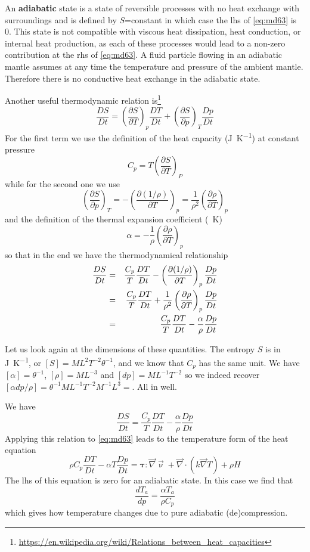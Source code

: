 An {\bf adiabatic} state is a state of reversible processes with no 
heat exchange with surroundings and is defined by $S$=constant in which 
case the lhs of \eqref{eq:md63} is 0. This state is
not compatible with viscous heat dissipation, heat conduction, or 
internal heat production, as each of these processes would lead to a 
non-zero contribution at the rhs of \eqref{eq:md63}. 
A fluid particle flowing in an adiabatic mantle assumes at any time 
the temperature and pressure
of the ambient mantle. Therefore there is no conductive heat exchange 
in the adiabatic state.

Another useful thermodynamic relation is\footnote{\url{https://en.wikipedia.org/wiki/Relations_between_heat_capacities}} 
\[
\frac{DS}{Dt} = 
\left( \frac{\partial S}{\partial T} \right)_p \frac{DT}{Dt}
+
\left( \frac{\partial S}{\partial p} \right)_T \frac{Dp}{Dt}
\]
For the first term we use the definition of the 
heat capacity (\si{\joule\per\kelvin}) at constant pressure 
\[
C_p = T \left(\frac{\partial S}{\partial T} \right)_P
\]
while for the second one we use 
\[
\left( \frac{\partial S}{\partial p}  \right)_T
= -\left( \frac{\partial (1/\rho)}{\partial T}  \right)_p
= \frac{1}{\rho^2} \left(  \frac{\partial \rho}{\partial T} \right)_p
\] 
and the definition of 
the thermal expansion coefficient (\si{\per\kelvin})
\[
\alpha = -\frac{1}{\rho} \left(\frac{\partial \rho}{\partial T} \right)_p
\] 
so that in the end  
we have the thermodynamical relationship
\begin{eqnarray}
\frac{DS}{Dt} 
&=& 
\frac{C_p}{T}\frac{DT}{Dt}-\left( \frac{\partial (1/\rho)}{\partial T}  \right)_p \frac{Dp}{Dt} \nonumber\\
&=& 
\frac{C_p}{T}\frac{DT}{Dt}+\frac{1}{\rho^2} \left( \frac{\partial \rho}{\partial T}\right)_p\frac{Dp}{Dt}\nonumber\\
&=& 
\frac{C_p}{T}\frac{DT}{Dt} - \frac{\alpha}{\rho} \frac{Dp}{Dt}\nonumber
\end{eqnarray}

\begin{remark}
Let us look again at the dimensions of these quantities.
The entropy $S$ is in \si{\joule\per\kelvin}, or $[S]=ML^2T^{-2}\theta^{-1}$, 
and we know that $C_p$ has the same unit.
We have $[\alpha]=\theta^{-1}$, $[\rho]=ML^{-3}$ and $[dp]=ML^{-1}T^{-2}$ so 
we indeed recover $[\alpha dp /\rho]= \theta^{-1} ML^{-1}T^{-2} M^{-1}L^{3}=$.
All in well.
\end{remark}

We have 
\[
\frac{DS}{Dt}
= \frac{C_p}{T} \frac{DT}{Dt} - \frac{\alpha}{\rho} \frac{Dp}{Dt} 
\]
Applying this relation to \eqref{eq:md63}
leads to the temperature form of the heat equation
\begin{equation}
\rho C_p \frac{DT}{Dt} - \alpha T \frac{Dp}{Dt} = 
{\bm \tau} : \vec\nabla\vec\upnu  
+\vec\nabla \cdot (k \vec\nabla T) + \rho H
\label{eq:md64}
\end{equation}
The lhs of this equation is zero for an adiabatic state. In this case we find that
\begin{equation}
\frac{dT_a}{dp} = \frac{\alpha T_a}{\rho C_p}
\label{eq:md65}
\end{equation}
which gives how temperature changes due to pure adiabatic (de)compression.

